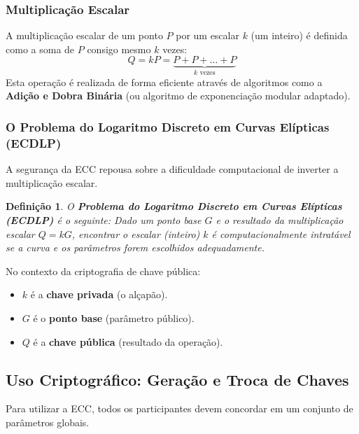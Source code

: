 \documentclass{article}
\theoremstyle{definicao_estilo}
\newtheorem{definicao}{Definição}
\begin{document}
\subsubsection{Multiplicação Escalar}
A multiplicação escalar de um ponto $P$ por um escalar $k$ (um inteiro) é definida como a soma de $P$ consigo mesmo $k$ vezes:
$$ Q = kP = \underbrace{P + P + \dots + P}_{k \text{ vezes}} $$
Esta operação é realizada de forma eficiente através de algoritmos como a \textbf{Adição e Dobra Binária} (ou algoritmo de exponenciação modular adaptado).

\subsubsection{O Problema do Logaritmo Discreto em Curvas Elípticas (ECDLP)}
A segurança da ECC repousa sobre a dificuldade computacional de inverter a multiplicação escalar.

\begin{definicao}
O \textbf{Problema do Logaritmo Discreto em Curvas Elípticas (ECDLP)} é o seguinte: Dado um ponto base $G$ e o resultado da multiplicação escalar $Q = kG$, encontrar o escalar (inteiro) $k$ é computacionalmente intratável se a curva e os parâmetros forem escolhidos adequadamente.
\end{definicao}

No contexto da criptografia de chave pública:
\begin{itemize}
\item $k$ é a \textbf{chave privada} (o alçapão).
\item $G$ é o \textbf{ponto base} (parâmetro público).
\item $Q$ é a \textbf{chave pública} (resultado da operação).
\end{itemize}

\subsection{Uso Criptográfico: Geração e Troca de Chaves}
Para utilizar a ECC, todos os participantes devem concordar em um conjunto de parâmetros globais.
\end{document}
